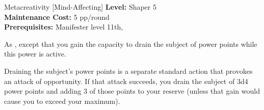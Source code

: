 {Metacreativity [Mind-Affecting]}
{
	\textbf{Level:}
	Shaper 5\\
	\textbf{Maintenance Cost:}
	5 pp/round\\
	\textbf{Prerequisites:}
	Manifester level 11th, \\
}
{
	As , except that you gain the capacity to drain the subject of power points while this power is active.

	Draining the subject's power points is a separate standard action that provokes an attack of opportunity. If that attack succeeds, you drain the subject of 3d4 power points and adding 3 of those points to your reserve (unless that gain would cause you to exceed your maximum).
}
